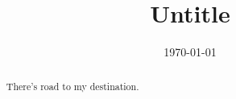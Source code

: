 \documentclass[a4paper,10pt]{article}
\title{Untitle}
\date{\today}
\begin{document}
\maketitle
\renewcommand{\abstractname}{MOVE FORWARD}
\begin{abstract}
	\begin{center}
        There's road to my destination.
	\end{center}
\end{abstract}
% 
\end{document}
